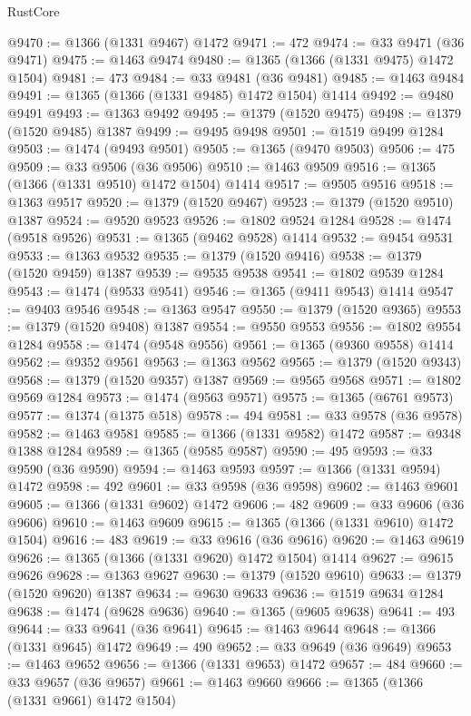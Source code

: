 \begin{lexlean}{RustCore}
\begin{coremodule}
@9470 := @1366 (@1331 @9467) @1472
@9471 := 472
@9474 := @33 @9471 (@36 @9471)
@9475 := @1463 @9474
@9480 := @1365 (@1366 (@1331 @9475) @1472 @1504)
@9481 := 473
@9484 := @33 @9481 (@36 @9481)
@9485 := @1463 @9484
@9491 := @1365 (@1366 (@1331 @9485) @1472 @1504) @1414
@9492 := @9480 @9491
@9493 := @1363 @9492
@9495 := @1379 (@1520 @9475)
@9498 := @1379 (@1520 @9485) @1387
@9499 := @9495 @9498
@9501 := @1519 @9499 @1284
@9503 := @1474 (@9493 @9501)
@9505 := @1365 (@9470 @9503)
@9506 := 475
@9509 := @33 @9506 (@36 @9506)
@9510 := @1463 @9509
@9516 := @1365 (@1366 (@1331 @9510) @1472 @1504) @1414
@9517 := @9505 @9516
@9518 := @1363 @9517
@9520 := @1379 (@1520 @9467)
@9523 := @1379 (@1520 @9510) @1387
@9524 := @9520 @9523
@9526 := @1802 @9524 @1284
@9528 := @1474 (@9518 @9526)
@9531 := @1365 (@9462 @9528) @1414
@9532 := @9454 @9531
@9533 := @1363 @9532
@9535 := @1379 (@1520 @9416)
@9538 := @1379 (@1520 @9459) @1387
@9539 := @9535 @9538
@9541 := @1802 @9539 @1284
@9543 := @1474 (@9533 @9541)
@9546 := @1365 (@9411 @9543) @1414
@9547 := @9403 @9546
@9548 := @1363 @9547
@9550 := @1379 (@1520 @9365)
@9553 := @1379 (@1520 @9408) @1387
@9554 := @9550 @9553
@9556 := @1802 @9554 @1284
@9558 := @1474 (@9548 @9556)
@9561 := @1365 (@9360 @9558) @1414
@9562 := @9352 @9561
@9563 := @1363 @9562
@9565 := @1379 (@1520 @9343)
@9568 := @1379 (@1520 @9357) @1387
@9569 := @9565 @9568
@9571 := @1802 @9569 @1284
@9573 := @1474 (@9563 @9571)
@9575 := @1365 (@6761 @9573)
@9577 := @1374 (@1375 @518)
@9578 := 494
@9581 := @33 @9578 (@36 @9578)
@9582 := @1463 @9581
@9585 := @1366 (@1331 @9582) @1472
@9587 := @9348 @1388 @1284
@9589 := @1365 (@9585 @9587)
@9590 := 495
@9593 := @33 @9590 (@36 @9590)
@9594 := @1463 @9593
@9597 := @1366 (@1331 @9594) @1472
@9598 := 492
@9601 := @33 @9598 (@36 @9598)
@9602 := @1463 @9601
@9605 := @1366 (@1331 @9602) @1472
@9606 := 482
@9609 := @33 @9606 (@36 @9606)
@9610 := @1463 @9609
@9615 := @1365 (@1366 (@1331 @9610) @1472 @1504)
@9616 := 483
@9619 := @33 @9616 (@36 @9616)
@9620 := @1463 @9619
@9626 := @1365 (@1366 (@1331 @9620) @1472 @1504) @1414
@9627 := @9615 @9626
@9628 := @1363 @9627
@9630 := @1379 (@1520 @9610)
@9633 := @1379 (@1520 @9620) @1387
@9634 := @9630 @9633
@9636 := @1519 @9634 @1284
@9638 := @1474 (@9628 @9636)
@9640 := @1365 (@9605 @9638)
@9641 := 493
@9644 := @33 @9641 (@36 @9641)
@9645 := @1463 @9644
@9648 := @1366 (@1331 @9645) @1472
@9649 := 490
@9652 := @33 @9649 (@36 @9649)
@9653 := @1463 @9652
@9656 := @1366 (@1331 @9653) @1472
@9657 := 484
@9660 := @33 @9657 (@36 @9657)
@9661 := @1463 @9660
@9666 := @1365 (@1366 (@1331 @9661) @1472 @1504)

\end{coremodule}
\end{lexlean}
